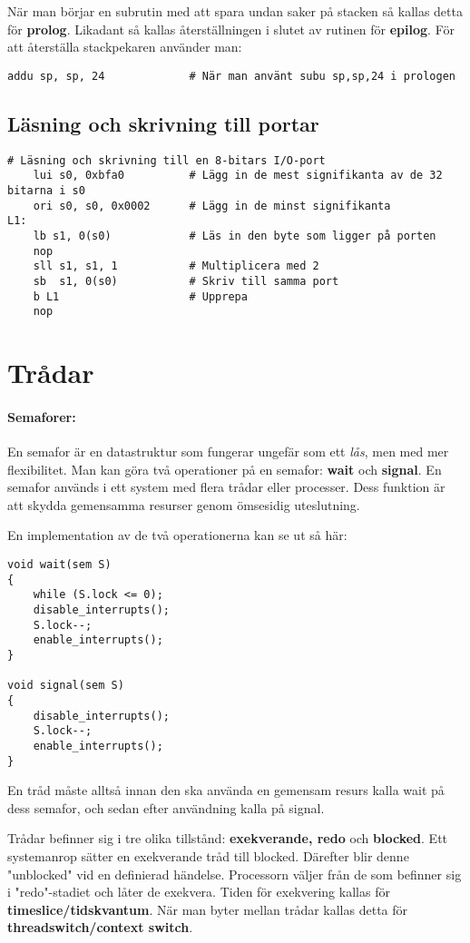 \documentclass[a4paper]{article}
\begin{document}
När man börjar en subrutin med att spara undan saker på stacken så kallas detta för \textbf{prolog}. Likadant så kallas återställningen i slutet av rutinen för \textbf{epilog}. För att återställa stackpekaren använder man:
\begin{verbatim}
addu sp, sp, 24             # När man använt subu sp,sp,24 i prologen
\end{verbatim}

\subsection{Läsning och skrivning till portar}
\begin{verbatim}
# Läsning och skrivning till en 8-bitars I/O-port
    lui s0, 0xbfa0          # Lägg in de mest signifikanta av de 32 bitarna i s0
    ori s0, s0, 0x0002      # Lägg in de minst signifikanta
L1:
    lb s1, 0(s0)            # Läs in den byte som ligger på porten
    nop
    sll s1, s1, 1           # Multiplicera med 2
    sb  s1, 0(s0)           # Skriv till samma port
    b L1                    # Upprepa
    nop
\end{verbatim}
\section{Trådar}
\paragraph{Semaforer:} En semafor är en datastruktur som fungerar ungefär som ett \emph{lås}, men med mer flexibilitet. Man kan göra två operationer på en semafor: \textbf{wait} och \textbf{signal}. En semafor används i ett system med flera trådar eller processer. Dess funktion är att skydda gemensamma resurser genom ömsesidig uteslutning.

En implementation av de två operationerna kan se ut så här:

\begin{verbatim}
void wait(sem S)
{
    while (S.lock <= 0);
    disable_interrupts();
    S.lock--;
    enable_interrupts();
}

void signal(sem S)
{
    disable_interrupts();
    S.lock--;
    enable_interrupts();
}
\end{verbatim}
En tråd måste alltså innan den ska använda en gemensam resurs kalla wait på dess semafor, och sedan efter användning kalla på signal.

Trådar befinner sig i tre olika tillstånd: \textbf{exekverande, redo} och \textbf{blocked}. Ett systemanrop sätter en exekverande tråd till blocked. Därefter blir denne "unblocked" vid en definierad händelse. Processorn väljer från de som befinner sig i "redo"-stadiet och låter de exekvera. Tiden för exekvering kallas för \textbf{timeslice/tidskvantum}. När man byter mellan trådar kallas detta för \textbf{threadswitch/context switch}.
\end{document}
